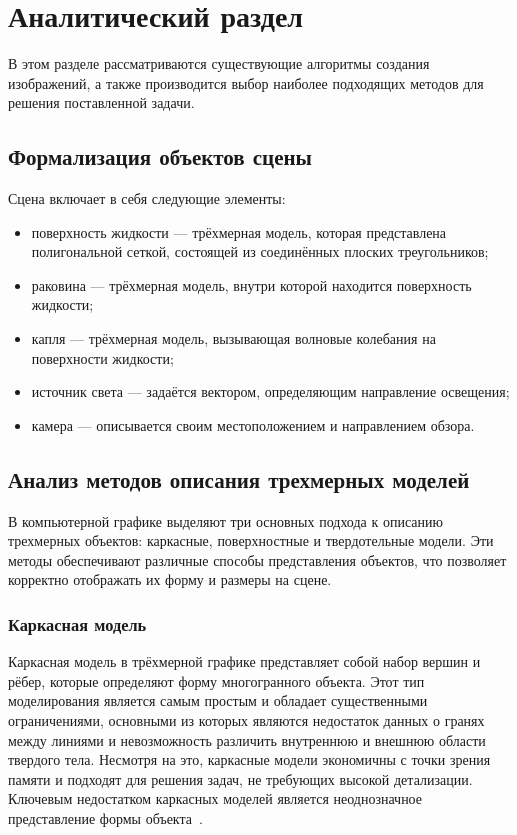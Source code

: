 \chapter{Аналитический раздел}

В этом разделе рассматриваются существующие алгоритмы создания изображений, а также производится выбор наиболее подходящих методов для решения поставленной задачи.

\section{Формализация объектов сцены}

Сцена включает в себя следующие элементы:
\begin{itemize}[label*=---]
    \item поверхность жидкости --- трёхмерная модель, которая представлена полигональной сеткой, состоящей из соединённых плоских треугольников;
    \item раковина --- трёхмерная модель, внутри которой находится поверхность жидкости;
    \item капля --- трёхмерная модель, вызывающая волновые колебания на поверхности жидкости;
    \item источник света --- задаётся вектором, определяющим направление освещения;
    \item камера --- описывается своим местоположением и направлением обзора.
\end{itemize}

\section{Анализ методов описания трехмерных моделей}

В компьютерной графике выделяют три основных подхода к описанию трехмерных объектов: каркасные, поверхностные и твердотельные модели.
Эти методы обеспечивают различные способы представления объектов, что позволяет корректно отображать их форму и размеры на сцене.

\subsection{Каркасная модель}
Каркасная модель в трёхмерной графике представляет собой набор вершин и рёбер, которые определяют форму многогранного объекта.
Этот тип моделирования является самым простым и обладает существенными ограничениями, основными из которых являются недостаток данных о гранях между линиями и невозможность различить внутреннюю и внешнюю области твердого тела.
Несмотря на это, каркасные модели экономичны с точки зрения памяти и подходят для решения задач, не требующих высокой детализации.
Ключевым недостатком каркасных моделей является неоднозначное представление формы объекта~\cite{MTM}.


